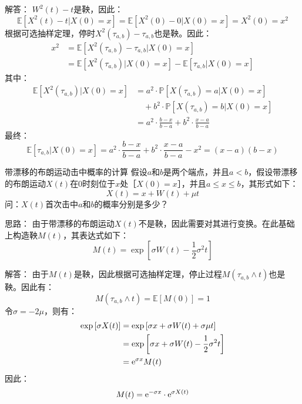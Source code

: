 \documentclass[t]{beamer}
\renewcommand{\Pr}{\mathbb{P}}
\newcommand{\E}{\mathbb{E}}
\begin{document}
      \begin{frame}{解答：}\small
        $W^2(t)-t$是鞅，因此：
        \[\E\left[X^2(t)-t|X(0)=x\right]=\E\left[X^2(0)-0|X(0)=x\right]=X^2(0)=x^2 \]
        根据可选抽样定理，停时$X^2(\tau_{a,b})-\tau_{a,b}$也是鞅。因此：
        \[\begin{split}
          x^2&=\E\left[X^2(\tau_{a,b})-\tau_{a,b}|X(0)=x\right]\\
          &=\E\left[X^2(\tau_{a,b})|X(0)=x\right]-\E\left[\tau_{a,b}|X(0)=x\right]
        \end{split} \]
        其中：
        \[\begin{split}
        \E\left[X^2(\tau_{a,b})|X(0)=x\right]&=a^2\cdot \Pr\left[X(\tau_{a,b})=a|X(0)=x\right]\\
        &\quad +b^2\cdot \Pr\left[X(\tau_{a,b})=b|X(0)=x\right]\\
        &=a^2\cdot \frac{b-x}{b-a}+b^2\cdot \frac{x-a}{b-a}
        \end{split} \]   
        最终： \[\E\left[\tau_{a,b}|X(0)=x\right]=a^2\cdot \frac{b-x}{b-a}+b^2\cdot \frac{x-a}{b-a}-x^2=(x-a)(b-x) \]  
      \end{frame}

      \begin{frame}{带漂移的布朗运动击中概率的计算}
        假设$a$和$b$是两个端点，并且$a<b$，假设带漂移的布朗运动$X(t)$在0时刻位于$x$处［$X(0)=x$］，并且$a\le x\le b$，其形式如下：
\[X(t)=x+W(t)+\mu t \]
问：$X(t)$首次击中$a$和$b$的概率分别是多少？

\begin{block}{思路：}
  由于带漂移的布朗运动$X(t)$不是鞅，因此需要对其进行变换。在此基础上构造鞅$M(t)$，其表达式如下：
\[M(t)=\exp\left[\sigma W(t)-\frac{1}{2}\sigma^2 t\right] \]
\end{block}

\end{frame}


      \begin{frame}{解答：}
    由于$M(t)$是鞅，因此根据可选抽样定理，停止过程$M(\tau_{a,b}\wedge t)$也是鞅。因此有：
    \[M(\tau_{a,b}\wedge t)=\E[M(0)]=1 \]
    令$\sigma=-2\mu$，则有：
\[\begin{split}
\exp\left[\sigma X(t) \right]&=\exp\left[\sigma x+\sigma W(t)+\sigma\mu t \right]\\
&=\exp\left[\sigma x+\sigma W(t)-\frac{1}{2}\sigma^2 t \right]\\
&={\rm e}^{\sigma x}M(t)
\end{split} \]
因此：$$M(t)={\rm e}^{-\sigma x}\cdot {\rm e}^{\sigma X(t)}$$    
      \end{frame}
\end{document}
